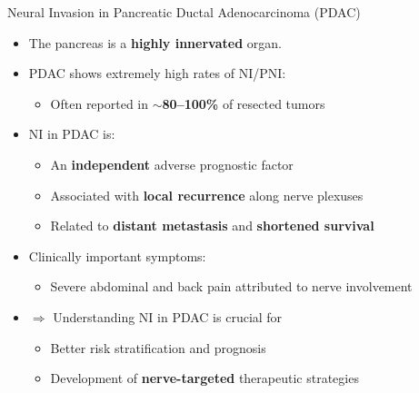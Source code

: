 \documentclass[10pt]{beamer}
\theoremstyle{plain}
\begin{document}
\begin{frame}{Neural Invasion in Pancreatic Ductal Adenocarcinoma (PDAC)}
  \begin{itemize}
    \item The pancreas is a \textbf{highly innervated} organ.
    \item PDAC shows extremely high rates of NI/PNI:
      \begin{itemize}
        \item Often reported in \textbf{\(\sim\)80--100\%} of resected tumors
      \end{itemize}
    \item NI in PDAC is:
      \begin{itemize}
        \item An \textbf{independent} adverse prognostic factor
        \item Associated with \textbf{local recurrence} along nerve plexuses
        \item Related to \textbf{distant metastasis} and \textbf{shortened survival}
      \end{itemize}
    \item Clinically important symptoms:
      \begin{itemize}
        \item Severe abdominal and back pain attributed to nerve involvement
      \end{itemize}
    \item \(\Rightarrow\) Understanding NI in PDAC is crucial for
      \begin{itemize}
        \item Better risk stratification and prognosis
        \item Development of \textbf{nerve-targeted} therapeutic strategies
      \end{itemize}
  \end{itemize}
\end{frame}
\end{document}
